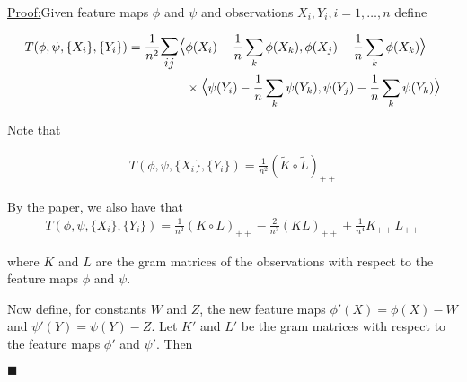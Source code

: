 \documentclass{article}
\newenvironment{claimproof}[1]{\par\noindent\underline{Proof:}\space#1}{\hfill $\blacksquare$}
\begin{document}
\begin{claimproof}
Given feature maps $\phi$ and $\psi$ and observations $X_i, Y_i, i=1,\ldots,n$ define 

\begin{align*}
T(\phi, \psi, \{X_i\},\{Y_i\}) = \frac{1}{n^2} \mathlarger{\mathlarger{\sum_{ij}}} \mathlarger{\mathlarger{\langle}} & \phi(X_i) - \frac{1}{n}\sum_k \phi(X_k), \phi(X_j) - \frac{1}{n}\sum_k \phi(X_k) \mathlarger{\mathlarger{\rangle}} \\ &\times \mathlarger{\mathlarger{\langle}} \psi(Y_i) - \frac{1}{n}\sum_k \psi(Y_k), \psi(Y_j) - \frac{1}{n}\sum_k \psi(Y_k) \mathlarger{\mathlarger{\rangle}}
\end{align*}

Note that 

\begin{align*}
T(\phi, \psi, \{X_i\},\{Y_i\}) = \frac{1}{n^2} (\tilde{K}\circ \tilde{L})_{++}
\end{align*}

By the paper, we also have that 
\begin{align*}
T(\phi, \psi, \{X_i\},\{Y_i\}) = \frac{1}{n^2}(K\circ L)_{++} - \frac{2}{n^3}(KL)_{++} + \frac{1}{n^4}K_{++}L_{++}
\end{align*}

where $K$ and $L$ are the gram matrices of the observations with respect to the feature maps $\phi$ and $\psi$.

Now define, for constants $W$ and $Z$, the new feature maps $\phi'(X) = \phi(X) - W$ and $\psi'(Y) = \psi(Y) - Z$. Let $K'$ and $L'$ be the gram matrices with respect to the feature maps $\phi'$ and $\psi'$. Then


\end{claimproof}
\end{document}
